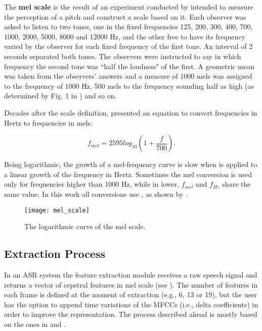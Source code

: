The \textbf{mel scale} is the result of an experiment conducted by  intended to measure the perception of a pitch and construct a scale based on it. Each observer was asked to listen to two tones, one in the fixed frequencies 125, 200, 300, 400, 700, 1000, 2000, 5000, 8000 and 12000 Hz, and the other free to have its frequency varied by the observer for each fixed frequency of the first tone. An interval of 2 seconds separated both tones. The observers were instructed to say in which frequency the second tone was ``half the loudness" of the first. A geometric mean was taken from the observers' answers and a measure of 1000 mels was assigned to the frequency of 1000 Hz, 500 mels to the frequency sounding half as high (as determined by Fig. 1 in ) and so on.

Decades after the scale definition,  presented an equation to convert frequencies in Hertz to frequencies in mels:

\begin{equation}
    f_{mel} = 2595 log_{10}(1 + \frac{f}{700}).
    \label{eq:mel_conversion}
\end{equation}

\noindent Being logarithmic, the growth of a mel-frequency curve is slow when  is applied to a linear growth of the frequency in Hertz. Sometimes the mel conversion is used only for frequencies higher than 1000 Hz, while in lower, $f_{mel}$ and $f_{Hz}$ share the same value. In this work all conversions use , as shown by .

\begin{figure}[ht]
    \centering
    \texttt{[image: mel\_scale]}
    \caption{The logarithmic curve of the mel scale.}
    \label{fig:mel_scale}
\end{figure}

\subsection{Extraction Process}

In an ASR system the feature extraction module receives a raw speech signal and returns a vector of cepstral features in mel scale (see ). The number of features in each frame is defined at the moment of extraction (e.g., 6, 13 or 19), but the user has the option to append time variations of the MFCCs (i.e., delta coefficients) in order to improve the representation. The process described ahead is mostly based on the ones in  and .

